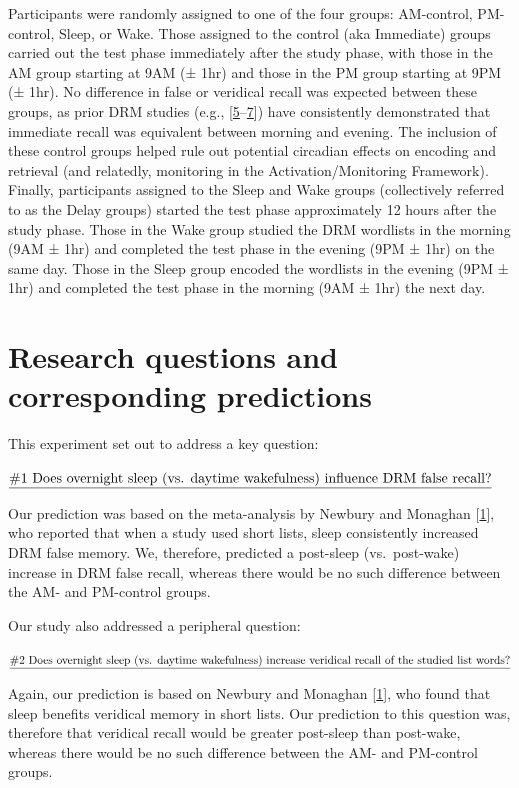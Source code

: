 \documentclass[
]{article}
\begin{document}
Participants were randomly assigned to one of the four groups: AM-control, PM-control, Sleep, or Wake. Those assigned to the control (aka Immediate) groups carried out the test phase immediately after the study phase, with those in the AM group starting at 9AM (± 1hr) and those in the PM group starting at 9PM (± 1hr). No difference in false or veridical recall was expected between these groups, as prior DRM studies (e.g., {[}\protect\hyperlink{ref-fenn2009a}{5}--\protect\hyperlink{ref-payne2009a}{7}{]}) have consistently demonstrated that immediate recall was equivalent between morning and evening. The inclusion of these control groups helped rule out potential circadian effects on encoding and retrieval (and relatedly, monitoring in the Activation/Monitoring Framework). Finally, participants assigned to the Sleep and Wake groups (collectively referred to as the Delay groups) started the test phase approximately 12 hours after the study phase. Those in the Wake group studied the DRM wordlists in the morning (9AM ± 1hr) and completed the test phase in the evening (9PM ± 1hr) on the same day. Those in the Sleep group encoded the wordlists in the evening (9PM ± 1hr) and completed the test phase in the morning (9AM ± 1hr) the next day.

\hypertarget{research-questions-and-corresponding-predictions}{%
\section{Research questions and corresponding predictions}\label{research-questions-and-corresponding-predictions}}

This experiment set out to address a key question:

\(\text{\underline{\#1 Does overnight sleep (vs. daytime wakefulness) influence DRM false recall?}}\)

Our prediction was based on the meta-analysis by Newbury and Monaghan {[}\protect\hyperlink{ref-newbury2019a}{1}{]}, who reported that when a study used short lists, sleep consistently increased DRM false memory. We, therefore, predicted a post-sleep (vs.~post-wake) increase in DRM false recall, whereas there would be no such difference between the AM- and PM-control groups.

Our study also addressed a peripheral question:

\(\text{\underline{\#2 Does overnight sleep (vs. daytime wakefulness) increase veridical recall of the studied list words?}}\)

Again, our prediction is based on Newbury and Monaghan {[}\protect\hyperlink{ref-newbury2019a}{1}{]}, who found that sleep benefits veridical memory in short lists. Our prediction to this question was, therefore that veridical recall would be greater post-sleep than post-wake, whereas there would be no such difference between the AM- and PM-control groups.
\end{document}

